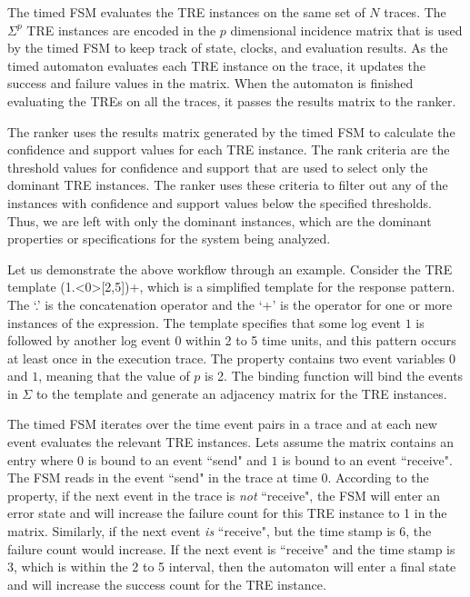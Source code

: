 \documentclass[]{sigplanconf}
\begin{document}
The timed FSM evaluates the TRE instances on the same set of $N$ traces. The $\Sigma^p$ TRE instances are encoded in the $p$ dimensional incidence matrix that is used by the timed FSM to keep track of state, clocks, and evaluation results. As the timed automaton evaluates each TRE instance on the trace, it updates the success and failure values in the matrix. When the automaton is finished evaluating the TREs on all the traces, it passes the results matrix to the ranker.


The ranker uses the results matrix generated by the timed FSM to calculate the confidence and support values for each TRE instance. The rank criteria are the threshold values for confidence and support that are used to select only the dominant TRE instances. The ranker uses these criteria to filter out any of the instances with confidence and support values below the specified thresholds. Thus, we are left with only the dominant instances, which are the dominant properties or specifications for the system being analyzed.


Let us demonstrate the above workflow through an example. Consider the TRE template (1.\textless0\textgreater[2,5])+, which is a simplified template for the response pattern. The `.' is the concatenation operator and the `+' is the operator for one or more instances of the expression.  The template specifies that some log event $1$ is followed by another log event $0$ within 2 to 5 time units, and this pattern occurs at least once in the execution trace. The property contains two event variables $0$ and $1$, meaning that the value of $p$ is 2. The binding function will bind the events in $\Sigma$ to the template and generate an adjacency matrix for the TRE instances.

The timed FSM iterates over the time event pairs in a trace and at each new event evaluates the relevant TRE instances. Lets assume the matrix contains an entry where $0$ is bound to an event ``send" and $1$ is bound to an event ``receive". The FSM reads in the event ``send" in the trace at time 0. According to the property, if the next event in the trace is \emph{not} ``receive", the FSM will enter an error state and will increase the failure count for this TRE instance to 1 in the matrix.
Similarly, if the next event \emph{is} ``receive", but the time stamp is 6, the failure count would increase.
If the next event is ``receive" and the time stamp is 3, which is within the 2 to 5 interval, then the automaton will enter a final state and will increase the success count for the TRE instance.
\end{document}
